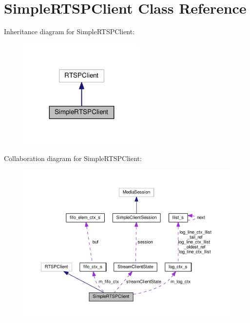 \hypertarget{classSimpleRTSPClient}{}\section{Simple\+R\+T\+S\+P\+Client Class Reference}
\label{classSimpleRTSPClient}


Inheritance diagram for Simple\+R\+T\+S\+P\+Client\+:\nopagebreak
\begin{figure}[H]
\begin{center}
\leavevmode
\includegraphics[width=179pt]{classSimpleRTSPClient__inherit__graph}
\end{center}
\end{figure}


Collaboration diagram for Simple\+R\+T\+S\+P\+Client\+:\nopagebreak
\begin{figure}[H]
\begin{center}
\leavevmode
\includegraphics[width=350pt]{classSimpleRTSPClient__coll__graph}
\end{center}
\end{figure}
